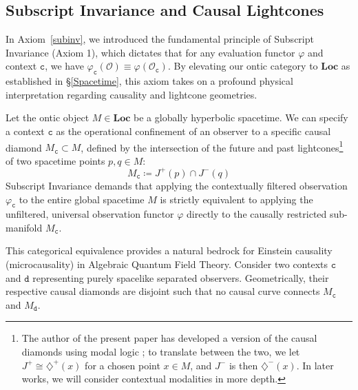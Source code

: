 \documentclass{article}
\numberwithin{tm}{section}
\numberwithin{dn}{section}
\numberwithin{as}{section}
\numberwithin{rk}{section}
\numberwithin{lem}{section}
\numberwithin{ax}{section}
\numberwithin{pp}{section}
\numberwithin{eg}{section}
\numberwithin{war}{section}
\numberwithin{equation}{section}
\numberwithin{prop}{section}
\numberwithin{nt}{section}
\numberwithin{rc}{section}
\def\code#1{\texttt{#1}}
\begin{document}
\subsection{Subscript Invariance and Causal Lightcones} \label{Lightcones}

In Axiom~\ref{subinv}, we introduced the fundamental principle of Subscript Invariance (Axiom 1), which dictates that for any evaluation functor $\varphi$ and context $\code{c}$, we have $\varphi_{\code{c}}(\mathcal{O}) \equiv \varphi(\mathcal{O}_{\code{c}})$. By elevating our ontic category to $\mathbf{Loc}$ as established in \S\ref{Spacetime}, this axiom takes on a profound physical interpretation regarding causality and lightcone geometries.

Let the ontic object $M \in \mathbf{Loc}$ be a globally hyperbolic spacetime. We can specify a context $\code{c}$ as the operational confinement of an observer to a specific causal diamond $M_{\code{c}} \subset M$, defined by the intersection of the future and past lightcones\footnote{The author of the present paper has developed a version of the causal diamonds using modal logic \cite{buchanan2, buchanan3}; to translate between the two, we let $J^+ \cong \diamondsuit^+(x)$ for a chosen point $x \in M$, and $J^-$ is then $\diamondsuit^-(x)$. In later works, we will consider contextual modalities in more depth.} of two spacetime points $p, q \in M$:
\begin{equation}
	M_{\code{c}} \coloneq J^+(p) \cap J^-(q)
\end{equation}
Subscript Invariance demands that applying the contextually filtered observation $\varphi_{\code{c}}$ to the entire global spacetime $M$ is strictly equivalent to applying the unfiltered, universal observation functor $\varphi$ directly to the causally restricted sub-manifold $M_{\code{c}}$. 

This categorical equivalence provides a natural bedrock for Einstein causality (microcausality) in Algebraic Quantum Field Theory. Consider two contexts $\code{c}$ and $\code{d}$ representing purely spacelike separated observers. Geometrically, their respective causal diamonds are disjoint such that no causal curve connects $M_{\code{c}}$ and $M_{\code{d}}$. 
\end{document}
